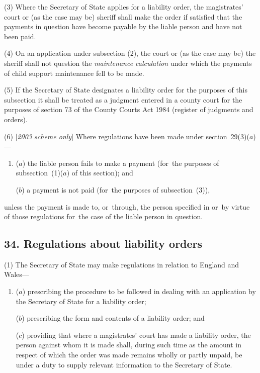 \documentclass[12pt,a4paper]{article}
\begin{document}
(3) Where the Secretary of State applies for a liability order, the magistrates' court or (as the case may be) sheriff shall make the order if satisfied that the payments in question have become payable by the liable person and have not been paid.

(4) On an application under subsection (2), the court or (as the case may be) the sheriff shall not question the 
\emph{maintenance calculation}  %
under which the payments of child support maintenance fell to be made.

(5) If the Secretary of State designates a liability order for the purposes of this subsection it shall be treated as a judgment entered in a county court for the purposes of section 73 of the County Courts Act 1984 (register of judgments and orders).

(6) [\emph{2003 scheme only}] Where regulations have been made under section~29(3)($a$)—
\begin{enumerate}\item[]
($a$) the liable person fails to make a payment (for~the purposes of subsection~(1)($a$)  of this section); and

($b$) a payment is not paid (for~the purposes of subsection~(3)),
\end{enumerate}
unless the payment is made to, or~through, the person specified in or~by virtue of those regulations for~the case of the liable person in question.


\subsection{34. Regulations about liability orders}

(1) The Secretary of State may make regulations in relation to England and Wales—
\begin{enumerate}\item[]
($a$) prescribing the procedure to be followed in dealing with an application by the Secretary of State for a liability order;

($b$) prescribing the form and contents of a liability order; and

($c$) providing that where a magistrates' court has made a liability order, the person against whom it is made shall, during such time as the amount in respect of which the order was made remains wholly or partly unpaid, be under a duty to supply relevant information to the Secretary of State.
\end{enumerate}
\end{document}
